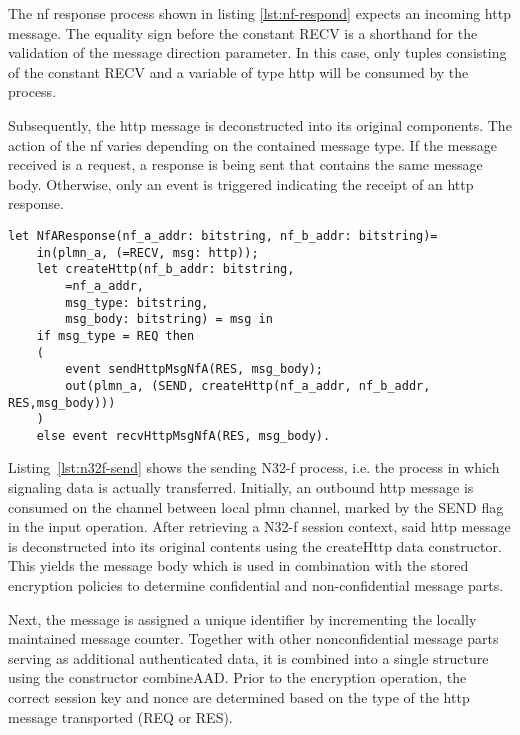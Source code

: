 The \gls{nf} response process shown in listing \ref{lst:nf-respond} expects an incoming \gls{http} message.
The equality sign before the constant {\sffamily RECV} is a shorthand for the validation of the message direction parameter.
In this case, only tuples consisting of the constant {\sffamily RECV} and a variable of type {\sffamily http} will be consumed by the process.

Subsequently, the \gls{http} message is deconstructed into its original components.
The action of the \gls{nf} varies depending on the contained message type.
If the message received is a request, a response is being sent that contains the same message body.
Otherwise, only an event is triggered indicating the receipt of an \gls{http} response.

\begin{lstlisting}[caption={Definition of the responding NF process},label={lst:nf-respond},firstnumber=745]
let NfAResponse(nf_a_addr: bitstring, nf_b_addr: bitstring)=
    in(plmn_a, (=RECV, msg: http));
    let createHttp(nf_b_addr: bitstring,
        =nf_a_addr,
        msg_type: bitstring,
        msg_body: bitstring) = msg in
    if msg_type = REQ then
    (
        event sendHttpMsgNfA(RES, msg_body);
        out(plmn_a, (SEND, createHttp(nf_a_addr, nf_b_addr, RES,msg_body)))
    )
    else event recvHttpMsgNfA(RES, msg_body).
\end{lstlisting}

Listing~\ref{lst:n32f-send} shows the sending N32-f process, i.e. the process in which signaling data is actually transferred.
Initially, an outbound \gls{http} message is consumed on the channel between local \gls{plmn} channel, marked by the {\sffamily SEND} flag in the input operation.
After retrieving a N32-f session context, said \gls{http} message is deconstructed into its original contents using the {\sffamily createHttp} data constructor.
This yields the message body which is used in combination with the stored encryption policies to determine confidential and non-confidential message parts.

Next, the message is assigned a unique identifier by incrementing the locally maintained message counter.
Together with other nonconfidential message parts serving as additional authenticated data, it is combined into a single structure using the constructor {\sffamily combineAAD}.
Prior to the encryption operation, the correct session key and nonce are determined based on the type of the \gls{http} message transported ({\sffamily REQ} or {\sffamily RES}).

